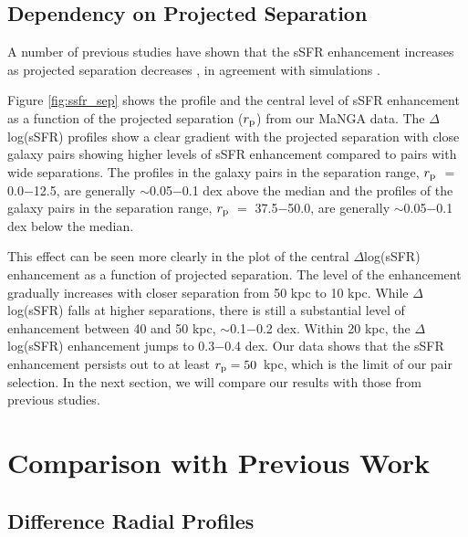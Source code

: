 \documentclass[iop,revtex4,twocolumn,apj,numberedappendix,appendixfloats]{emulateapj}
\begin{document}
\subsection{Dependency on Projected Separation}\label{sec:sep}

A number of previous studies have shown that the sSFR enhancement increases as projected separation decreases \citep[e.g.,][]{Li:2008, Ellison:2008, Scudder:2012, Patton:2013}, in agreement with simulations \citep{Scudder:2012}. 

Figure \ref{fig:ssfr_sep} shows the profile and the central level of sSFR enhancement as a function of the projected separation ($r_{\rm p}$) from our MaNGA data. The $\Delta$log(sSFR) profiles show a clear gradient with the projected separation with close galaxy pairs showing higher levels of sSFR enhancement compared to pairs with wide separations. The profiles in the galaxy pairs in the separation range, $r_{\rm p}$ $=$ 0.0$-$12.5, are generally $\sim$0.05$-$0.1 dex above the median and the profiles of the galaxy pairs in the separation range, $r_{\rm p}$ $=$ 37.5$-$50.0, are generally $\sim$0.05$-$0.1 dex below the median. 

This effect can be seen more clearly in the plot of the central $\Delta$log(sSFR) enhancement as a function of projected separation. The level of the enhancement gradually increases with closer separation from 50 kpc to 10 kpc. While $\Delta$log(sSFR) falls at higher separations, there is still a substantial level of enhancement between 40 and 50 kpc, $\sim$0.1$-$0.2 dex. Within 20 kpc, the $\Delta$log(sSFR) enhancement jumps to 0.3$-$0.4 dex. Our data shows that the sSFR enhancement persists out to at least $r_{\rm p} = 50$~kpc, which is the limit of our pair selection. In the next section, we will compare our results with those from previous studies.

\section{Comparison with Previous Work}\label{sec:disc}

\subsection{Difference Radial Profiles}
\end{document}
